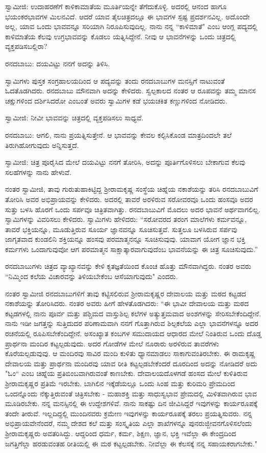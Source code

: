 ಸ್ವಾಮೀಜಿ: ಉದಾಹರಣೆಗೆ ಕಾಳಿಕಾಮಾತೆಯ ಮೂರ್ತಿಯನ್ನೇ ತೆಗೆದುಕೊಳ್ಳಿ. ಅದರಲ್ಲಿ ಆನಂದ ಹಾಗೂ ಭಯಂಕರಭಾವಗಳ ಮಿಲನವಿದೆ. ಆದರೆ ಯಾವ ತೈಲಚಿತ್ರದಲ್ಲೂ ಈ ಭಾವಗಳ ಸ್ಪಷ್ಟ ಪ್ರದರ್ಶನವಿಲ್ಲ. ಅದೊಂದೇ ಅಲ್ಲ, ಯಾವ ಒಂದು ಭಾವವನ್ನೂ ಸರಿಯಾಗಿ ನಿರೂಪಿಸುವುದಿಲ್ಲ. ನಾನು ನನ್ನ “ಕಾಳಿಮಾತೆ" ಎಂಬ ಆಂಗ್ಲ ಪದ್ಯದಲ್ಲಿ ಕಾಳಿಮಾತೆಯ ಕೆಲವು ಉಗ್ರಭಾವವನ್ನು ಕೊಡಲು ಯತ್ನಿಸಿದ್ದೇನೆ. ನೀವು ಆ ಭಾವನೆಗಳನ್ನು ಒಂದು ಚಿತ್ರದಲ್ಲಿ ವ್ಯಕ್ತಪಡಿಸಬಲ್ಲಿರಾ?

ರನದಬಾಬು: ದಯವಿಟ್ಟು ನನಗೆ ಅದನ್ನು ತಿಳಿಸಿ.

ಸ್ವಾಮಿಗಳು ಪುಸ್ತಕ ಸಂಗ್ರಹಾಲಯದಿಂದ ಆ ಪದ್ಯವನ್ನು ತಂದು ರನದಬಾಬುಗಳ ಮನಸ್ಸಿಗೆ ನಾಟುವಂತೆ ಓದತೊಡಗಿದರು. ರನದಬಾಬು ಮೌನವಾಗಿ ಅದನ್ನು ಕೇಳಿದರು. ಸ್ವಲ್ಪಕಾಲದ ನಂತರ ಆ ರೂಪವನ್ನು ತಮ್ಮ ಮಾನಸ ಚಕ್ಷುಗಳಿಂದ ದರ್ಶಿಸಿದರೋ ಎಂಬಂತೆ ಅವರು ಸ್ವಾಮಿಗಳ ಕಡೆ ಭಯಚಕಿತ ಕಣ್ಣುಗಳಿಂದ ನೋಡಿದರು.

ಸ್ವಾಮೀಜಿ: ನೀವೀ ಭಾವವನ್ನು ಚಿತ್ರದಲ್ಲಿ ವ್ಯಕ್ತಪಡಿಸಲು ಸಾಧ್ಯವೆ.

ರನದಬಾಬು: ಆಗಲಿ, ನಾನು ಪ್ರಯತ್ನಿಸುತ್ತೇನೆ. ಆ ಭಾವವನ್ನು ಕೇವಲ ಕಲ್ಪಿಸಿಕೊಂಡ ಮಾತ್ರದಿಂದಲೇ ತಲೆ ತಿರುಗಿಹೋಗುವುದು ಅನ್ನಿಸುತ್ತದೆ.

ಸ್ವಾಮೀಜಿ: ಚಿತ್ರ ಪೂರೈಸಿದ ಮೇಲೆ ದಯವಿಟ್ಟು ನನಗೆ ತೋರಿಸಿ, ಅದನ್ನು ಪೂರ್ತಿಗೊಳಿಸಲು ಬೇಕಾಗುವ ಕೆಲವು ಸಲಹೆಗಳನ್ನು ನಾನು ಹೇಳುವೆ.

ನಂತರ ಸ್ವಾಮೀಜಿ, ತಾವು ಗುರುತುಹಾಕಿಟ್ಟಿದ್ದ ಶ‍್ರೀರಾಮಕೃಷ್ಣ ಸಂಸ್ಥೆಯ ಚಿಹ್ನೆಯ ನಕಾಶೆಯನ್ನು ತರಿಸಿ ರನದಬಾಬುವಿಗೆ ತೋರಿಸಿ ಅವರ ಅಭಿಪ್ರಾಯವನ್ನು ಕೇಳಿದರು. ಅದರಲ್ಲಿ ತಾವರೆ ಅರಳಿರುವ ಸರೋವರವೂ ಒಂದು ಹಂಸವೂ ಅದರ ಸುತ್ತು ಬಳಸಿ ಹೊರಗೆ ಒಂದು ಸರ್ಪವೂ ಚಿತ್ರಿತವಾಗಿತ್ತು. ರನದಬಾಬುವಿಗೆ ಮೊದಲು ಅದರ ಭಾವನೆ ಅರ್ಥವಾಗಲಿಲ್ಲ. ಸ್ವಾಮಿಗಳನ್ನು ವಿವರಿಸಲು ಕೇಳಿದರು. ಸ್ವಾಮಿಗಳು ಹೇಳಿದರು: “ಸರೋವರದ ತರಂಗ ಮಾಲೆಗಳು ಕರ್ಮವನ್ನೂ, ತಾವರೆ ಭಕ್ತಿಯನ್ನೂ, ಮೂಡುತ್ತಿರುವ ಸೂರ್ಯ ಜ್ಞಾನವನ್ನೂ ಸೂಚಿಸುತ್ತವೆ. ಸುತ್ತಲೂ ಬಳಸಿರುವ ಸರ್ಪವು ಜಾಗೃತವಾದ ಕುಂಡಲಿನಿ ಶಕ್ತಿಯನ್ನೂ ಹಂಸವು ಪರಮಾತ್ಮನನ್ನೂ ಸೂಚಿಸುವುವು. ಯಾವಾಗ ಯೋಗ ಜ್ಞಾನ ಭಕ್ತಿ ಕರ್ಮಗಳು ಒಂದಾಗುವುವೋ ಆಗ ಪರಮಾತ್ಮನ ಸಾಕ್ಷಾತ್ಕಾರವಾಗುವುದೆಂಬ ಭಾವನೆಯನ್ನು ಈ ಚಿತ್ರ ಸೂಚಿಸುವುದು.”

ರನದಬಾಬುಗಳು ಚಿತ್ರದ ವ್ಯಾಖ್ಯಾನವನ್ನು ಕೇಳಿ ಕೃತಜ್ಞತೆಯಿಂದ ಕೊಂಚ ಹೊತ್ತು ಮೌನವಾಗಿದ್ದರು. ನಂತರ ಅವರು “ನಿಮ್ಮಿಂದ ಕಲೆಯ ವಿಚಾರವನ್ನು ತಿಳಿಯಬೇಕೆಂಬ ಆಸೆಯಾಗುವುದು" ಎಂದರು.

ನಂತರ ಸ್ವಾಮೀಜಿ ರನದಬಾಬುಗಳಿಗೆ ತಾವು ಕಟ್ಟಿಸಲಿರುವ ಶ‍್ರೀರಾಮಕೃಷ್ಣರ ದೇವಾಲಯ ಮತ್ತು ಮಠದ ಕಟ್ಟಡದ ನಕಾಶೆಯನ್ನು ತೋರಿಸಿದರು. ನಂತರ ಅವರು ಹೀಗೆ ಹೇಳತೊಡಗಿದರು: “ಈ ಭಾವೀ ದೇವಾಲಯ ಮತ್ತು ಮಠದ ಕಟ್ಟಡಗಳಲ್ಲಿ ನಾನು ಪೂರ್ವ ಮತ್ತು ಪಶ್ಚಿಮದ ವಾಸ್ತುಶಿಲ್ಪ ಕಲೆಗಳ ಅತ್ಯುತ್ತಮವಾದ ಅಂಶಗಳನ್ನು ಸೇರಿಸಬೇಕೆಂದಿದ್ದೇನೆ. ನಾನು ಇಡೀ ಜಗತ್ತನ್ನು ಸುತ್ತಿದುದರ ಪರಿಣಾಮವಾಗಿ ನನಗೆ ಗೊತ್ತಾಗಿರುವ ಶಿಲ್ಪಕಲೆಯ ಎಲ್ಲಾ ಭಾವನೆಗಳನ್ನೂ ಅದರ ರಚನೆಯಲ್ಲಿ ರೂಪಿಸಬೇಕೆಂದಿದ್ದೇನೆ. ಅಸಂಖ್ಯಾತ ಕಂಬಗಳ ಸಮುದಾಯದ ಆಧಾರದ ಮೇಲೆ ನಿಂತಿರುವ ಒಂದು ದೊಡ್ಡ ಪ್ರಾರ್ಥನಾ ಮಂದಿರ ಕಟ್ಟಲ್ಪಡುವುದು. ಅದರ ಗೋಡೆಗಳ ಮೇಲೆ ನೂರಾರು ಅರಳಿರುವ ತಾವರೆಗಳು ಕೊರೆಯಲ್ಪಡುವುವು. ಆ ಮಂದಿರವು ಸಾವಿರ ಮಂದಿ ಕುಳಿತು ಧ್ಯಾನಮಾಡಲು ಸಾಕಾಗುವಂತಿರಬೇಕು. ಈ ರಾಮಕೃಷ್ಣ ದೇವಾಲಯ ಮತ್ತು ಪ್ರಾರ್ಥನಾ ಮಂದಿರವು ಯಾವ ರೀತಿ ಕಟ್ಟಲ್ಪಡಬೇಕೆಂದರೆ ದೂರದಿಂದ ಅದನ್ನು ನೋಡಿದರೆ ಅದು "ಓಂ“ ಎಂಬ ಚಿಹ್ನೆಯ ಪ್ರತಿಬಿಂಬವಾಗಿರುವಂತೆ ಕಾಣಬೇಕು. ದೇವಾಲಯದೊಳಗಡೆ ಹಂಸದ ಮೇಲೆ ಕುಳಿತಿರುವ ಶ‍್ರೀರಾಮಕೃಷ್ಣರ ಪ್ರತಿಮೆ ಇರಬೇಕು. ಬಾಗಿಲಿನ ಇಕ್ಕೆಡೆಯಲ್ಲೂ ಒಂದು ಸಿಂಹ ಮತ್ತು ಕುರಿಮರಿ ಪ್ರೇಮದಿಂದ ಒಂದನ್ನೊಂದು ನೆಕ್ಕುತ್ತಿರುವಂತೆ ಚಿತ್ರಿಸಬೇಕು - ಮಹಾಶಕ್ತಿ ಮತ್ತು ಸಾಧುಸ್ವಭಾವ ಪ್ರೇಮದಲ್ಲಿ ಮಿಳಿತವಾಗಿರುವ ಭಾವ ಮೂಡಿರಬೇಕು. ನನ್ನ ಮನಸ್ಸಿನಲ್ಲಿ ಈ ಉದ್ದೇಶಗಳಿವೆ. ನಾನು ಸಾಕಷ್ಟು ದಿನ ಜೀವಿಸಿದ್ದರೆ ಇವುಗಳನ್ನು ಕಾರ್ಯರೂಪಕ್ಕೆ ತಂದೇ ತೀರುವೆ. ಇಲ್ಲದಿದ್ದಲ್ಲಿ ಮುಂದಿನವರು ಕ್ರಮೇಣ ಇವುಗಳನ್ನು ಕಾರ್ಯರೂಪಕ್ಕೆ ತರಲು ಪ್ರಯತ್ನಿಸುವರು. ನನ್ನ ಅಭಿಪ್ರಾಯವೇನೆಂದರೆ, ನಮ್ಮ ದೇಶದ ಕಲೆ ಮತ್ತು ಸಂಸ್ಕೃತಿಯ ಎಲ್ಲಾ ಶಾಖೆಗಳನ್ನೂ ಪುನರುಜ್ಜೀವನಗೊಳಿಸಲೆಂದು ಶ‍್ರೀರಾಮಕೃಷ್ಣರು ಅವತರಿಸಿದ್ದು. ಆದ್ದರಿಂದ ಧರ್ಮ, ಕರ್ಮ, ಶಿಕ್ಷಣ, ಜ್ಞಾನ, ಭಕ್ತಿ ಇವೆಲ್ಲಾ ಈ ಕೇಂದ್ರದಿಂದ ಜಗತ್ತಿಗೆಲ್ಲಾ ಹರಡುವಂತಹ ರೀತಿಯಲ್ಲಿ ಈ ಮಠ ಕಟ್ಟಲ್ಪಡಬೇಕು. ನೀವೆಲ್ಲಾ ಈ ಕೆಲಸಕ್ಕೆ ನನ್ನ ಸಹಾಯಕರಾಗಬೇಕು."

